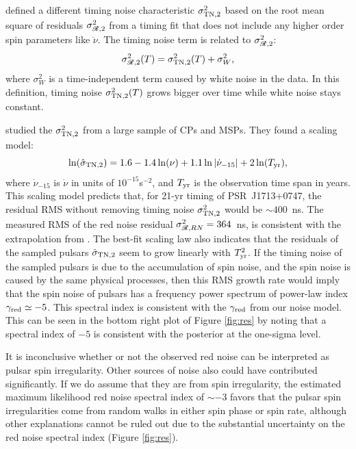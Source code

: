 \citet{ch80} defined a different timing noise characteristic $\sigma^2_{\rm
TN,2}$ based on the root mean square of residuals $\sigma^2_{\mathscr{R},2}$ from a
timing fit that does not include any higher order spin parameters like
$\ddot{\nu}$. 
The timing noise term is related to $\sigma^2_{\mathscr{R},2}$:
\begin{equation}
\sigma^2_{\msR,2}(T) = \sigma^2_{\rm TN,2}(T) + \sigma^2_W, 
\end{equation}
where $\sigma^2_W$ is a time-independent term caused by white 
noise in the data.
In this definition, timing noise $\sigma^2_{\rm TN,2}(T)$ grows bigger over
time while white noise stays constant.  

\citet{sc10} studied the $\sigma^2_{\rm TN,2}$ from a large sample of CPs and
MSPs. They found a scaling model:
\begin{equation}
\label{eq:sc10}
\ln(\hat{\sigma}_{\rm TN,2}) = 1.6 - 1.4\ln(\nu) +
1.1\ln|\dot{\nu}_{-15}|+2\ln(T_{\rm yr}),
\end{equation}
where $\dot{\nu}_{-15}$ is $\dot{\nu}$ in units of $10^{-15}$s$^{-2}$, and $T_{\rm yr}$
is the observation time span in years.
This scaling model predicts that, for 21-yr timing of PSR~J1713+0747, the
residual RMS without removing timing noise $\sigma^2_{\rm TN,2}$ would be
$\sim400$~ns. The measured RMS of the red noise residual 
$\sigma^2_{\mathscr{R},RN}=364$~ns, is consistent with the extrapolation
from \citet{sc10}.  
The best-fit scaling law also indicates that the residuals of the
sampled pulsars $\hat{\sigma}_{\rm TN,2}$ seem to grow linearly with $T_{\rm yr}^2$. 
If the timing noise of the sampled pulsars is due to the accumulation of 
spin noise, and the spin noise is caused by the same physical processes,
then this RMS growth rate would imply that the spin noise of pulsars has a
frequency power spectrum of power-law index $\gamma_{\rm red}\simeq -5$. This 
spectral index is consistent with the $\gamma_{\rm red}$
from our noise model. This can be seen in the bottom right plot of Figure \ref{fig:res} 
by noting that a spectral index of $-5$ is consistent with the posterior at the one-sigma
level. 

It is inconclusive whether or not the observed red noise can be interpreted as pulsar spin irregularity.
Other sources of noise also could have contributed significantly.
If we do assume that they are from spin irregularity, 
the estimated maximum likelihood red noise spectral index of $\sim-3$ 
favors that the pulsar spin irregularities come from
random walks in either spin phase or spin rate, although other explanations cannot be ruled out due to the
substantial uncertainty on the red noise spectral index (Figure \ref{fig:res}).


